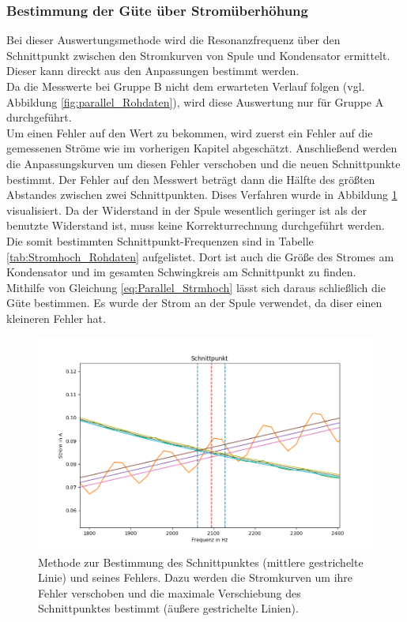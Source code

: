 \documentclass[12pt,a4paper]{article}
\begin{document}
\subsubsection{Bestimmung der Güte über Stromüberhöhung}
Bei dieser Auswertungsmethode wird die Resonanzfrequenz über den Schnittpunkt zwischen den Stromkurven von Spule und Kondensator ermittelt. Dieser kann direckt aus den Anpassungen bestimmt werden.\\
Da die Messwerte bei Gruppe B nicht dem erwarteten Verlauf folgen (vgl. Abbildung \ref{fig:parallel_Rohdaten}), wird diese Auswertung nur für Gruppe A durchgeführt.\\
Um einen Fehler auf den Wert zu bekommen, wird zuerst ein Fehler auf die gemessenen Ströme wie im vorherigen Kapitel abgeschätzt. Anschließend werden die Anpassungskurven um diesen Fehler verschoben und die neuen Schnittpunkte bestimmt. Der Fehler auf den Messwert beträgt dann die Hälfte des größten Abstandes zwischen zwei Schnittpunkten. Dises Verfahren wurde in Abbildung \ref{fig:parallel_Stromhoch} visualisiert.
Da der Widerstand in der Spule wesentlich geringer ist als der benutzte Widerstand ist, muss keine Korrekturrechnung durchgeführt werden.\\
Die somit bestimmten Schnittpunkt-Frequenzen sind in Tabelle \ref{tab:Stromhoch_Rohdaten} aufgelistet. Dort ist auch die Größe des Stromes am Kondensator und im gesamten Schwingkreis am Schnittpunkt zu finden. \\
Mithilfe von Gleichung \ref{eq:Parallel_Strmhoch} lässt sich daraus schließlich die Güte bestimmen. Es wurde der Strom an der Spule verwendet, da diser einen kleineren Fehler hat.

\begin{figure}
\centering
\includegraphics[scale=0.6]{Bilder/Parallel_Stromhoch.png}
\caption{Methode zur Bestimmung des Schnittpunktes (mittlere gestrichelte Linie) und seines Fehlers. Dazu werden die Stromkurven um ihre Fehler verschoben und die maximale Verschiebung des Schnittpunktes bestimmt (äußere gestrichelte Linien).}
\label{fig:parallel_Stromhoch}
\end{figure}
\end{document}
